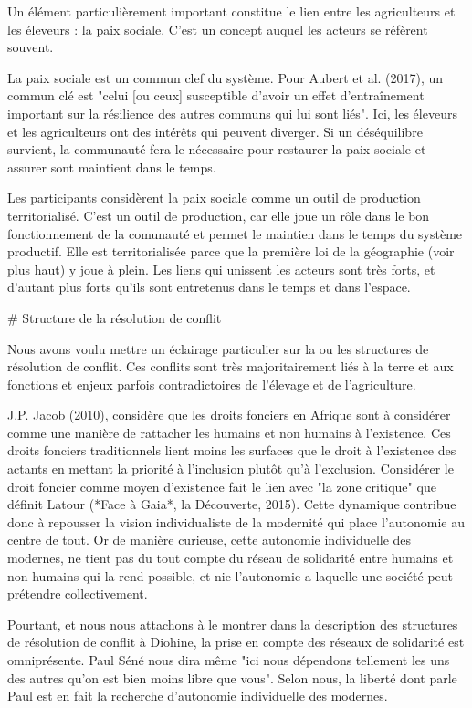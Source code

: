 Un élément particulièrement important constitue le lien entre les agriculteurs et les éleveurs : la paix sociale. C'est un concept auquel les acteurs se réfèrent souvent.

La paix sociale est un commun clef du système. Pour Aubert et al. (2017), un commun clé est "celui [ou ceux] susceptible d’avoir un effet d’entraînement important sur la résilience des autres communs qui lui sont liés". Ici, les éleveurs et les agriculteurs ont des intérêts qui peuvent diverger. Si un déséquilibre survient, la communauté fera le nécessaire pour restaurer la paix sociale et assurer sont maintient dans le temps.

Les participants considèrent la paix sociale comme un outil de production territorialisé. C'est un outil de production, car elle joue un rôle dans le bon fonctionnement de la comunauté et permet le maintien dans le temps du système productif. Elle est territorialisée parce que la première loi de la géographie (voir plus haut) y joue à plein. Les liens qui unissent les acteurs sont très forts, et d'autant plus forts qu'ils sont entretenus dans le temps et dans l'espace. 

# Structure de la résolution de conflit

Nous avons voulu mettre un éclairage particulier sur la ou les structures de résolution de conflit. Ces conflits sont très majoritairement liés à la terre et aux fonctions et enjeux parfois contradictoires de l'élevage et de l'agriculture. 

J.P. Jacob (2010), considère que les droits fonciers en Afrique sont à considérer comme une manière de rattacher les humains et non humains à l'existence. Ces droits fonciers traditionnels lient moins les surfaces que le droit à l'existence des actants en mettant la priorité à l'inclusion plutôt qu'à l'exclusion. Considérer le droit foncier comme moyen d'existence fait le lien avec "la zone critique" que définit Latour (*Face à Gaia*, la Découverte, 2015). Cette dynamique contribue donc à repousser la vision individualiste de la modernité qui place l'autonomie au centre de tout. Or de manière curieuse, cette autonomie individuelle des modernes, ne tient pas du tout compte du réseau de solidarité entre humains et non humains qui la rend possible, et nie l'autonomie a laquelle une société peut prétendre collectivement. 

Pourtant, et nous nous  attachons à le montrer dans la description des structures de résolution de conflit à Diohine, la prise en compte des réseaux de solidarité est omniprésente. Paul Séné nous dira même "ici nous dépendons tellement les uns des autres qu'on est bien moins libre que vous". Selon nous, la liberté dont parle Paul est en fait la recherche d'autonomie individuelle des modernes.


